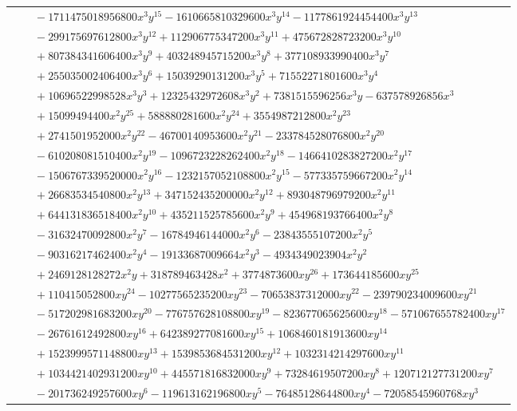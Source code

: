 \documentclass[11pt]{article}
\begin{document}
\begin{longtable}{@{}ll@{}}
 & $\quad -1711475018956800x^{3}y^{15}-1610665810329600x^{3}y^{14}-1177861924454400x^{3}y^{13}$\\
 & $\quad -299175697612800x^{3}y^{12}+112906775347200x^{3}y^{11}+475672828723200x^{3}y^{10}$\\
 & $\quad +807384341606400x^{3}y^{9}+403248945715200x^{3}y^{8}+377108933990400x^{3}y^{7}$\\
 & $\quad +255035002406400x^{3}y^{6}+15039290131200x^{3}y^{5}+71552271801600x^{3}y^{4}$\\
 & $\quad +10696522998528x^{3}y^{3}+12325432972608x^{3}y^{2}+7381515596256x^{3}y-637578926856x^{3}$\\
 & $\quad +15099494400x^{2}y^{25}+588880281600x^{2}y^{24}+3554987212800x^{2}y^{23}$\\
 & $\quad +2741501952000x^{2}y^{22}-46700140953600x^{2}y^{21}-233784528076800x^{2}y^{20}$\\
 & $\quad -610208081510400x^{2}y^{19}-1096723228262400x^{2}y^{18}-1466410283827200x^{2}y^{17}$\\
 & $\quad -1506767339520000x^{2}y^{16}-1232157052108800x^{2}y^{15}-577335759667200x^{2}y^{14}$\\
 & $\quad +26683534540800x^{2}y^{13}+347152435200000x^{2}y^{12}+893048796979200x^{2}y^{11}$\\
 & $\quad +644131836518400x^{2}y^{10}+435211525785600x^{2}y^{9}+454968193766400x^{2}y^{8}$\\
 & $\quad -31632470092800x^{2}y^{7}-16784946144000x^{2}y^{6}-23843555107200x^{2}y^{5}$\\
 & $\quad -90316217462400x^{2}y^{4}-19133687009664x^{2}y^{3}-4934349023904x^{2}y^{2}$\\
 & $\quad +2469128128272x^{2}y+318789463428x^{2}+3774873600xy^{26}+173644185600xy^{25}$\\
 & $\quad +110415052800xy^{24}-10277565235200xy^{23}-70653837312000xy^{22}-239790234009600xy^{21}$\\
 & $\quad -517202981683200xy^{20}-776757628108800xy^{19}-823677065625600xy^{18}-571067655782400xy^{17}$\\
 & $\quad -26761612492800xy^{16}+642389277081600xy^{15}+1068460181913600xy^{14}$\\
 & $\quad +1523999571148800xy^{13}+1539853684531200xy^{12}+1032314214297600xy^{11}$\\
 & $\quad +1034421402931200xy^{10}+445571816832000xy^{9}+73284619507200xy^{8}+120712127731200xy^{7}$\\
 & $\quad -201736249257600xy^{6}-119613162196800xy^{5}-76485128644800xy^{4}-72058545960768xy^{3}$\\

\end{longtable}
\end{document}
